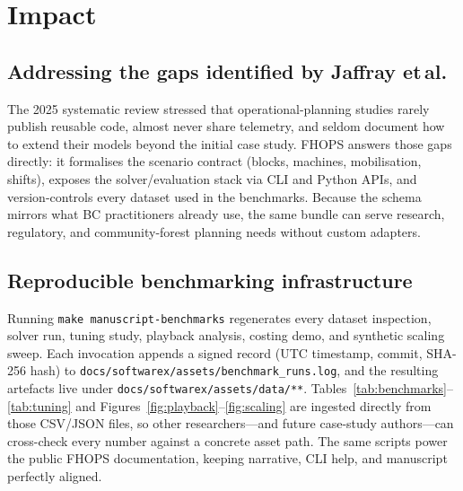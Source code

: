 \section{Impact}
\label{sec:impact}

\subsection{Addressing the gaps identified by Jaffray et\,al.}
The 2025 systematic review stressed that operational-planning studies rarely publish reusable code, almost never share telemetry, and seldom document how to extend their models beyond the initial case study. FHOPS answers those gaps directly: it formalises the scenario contract (blocks, machines, mobilisation, shifts), exposes the solver/evaluation stack via CLI and Python APIs, and version-controls every dataset used in the benchmarks. Because the schema mirrors what BC practitioners already use, the same bundle can serve research, regulatory, and community-forest planning needs without custom adapters.

\subsection{Reproducible benchmarking infrastructure}
Running \texttt{make manuscript-benchmarks} regenerates every dataset inspection, solver run, tuning study, playback analysis, costing demo, and synthetic scaling sweep. Each invocation appends a signed record (UTC timestamp, commit, SHA-256 hash) to \texttt{docs/softwarex/assets/benchmark\_runs.log}, and the resulting artefacts live under \texttt{docs/softwarex/assets/data/**}. Tables~\ref{tab:benchmarks}--\ref{tab:tuning} and Figures~\ref{fig:playback}--\ref{fig:scaling} are ingested directly from those CSV/JSON files, so other researchers—and future case-study authors—can cross-check every number against a concrete asset path. The same scripts power the public FHOPS documentation, keeping narrative, CLI help, and manuscript perfectly aligned.

